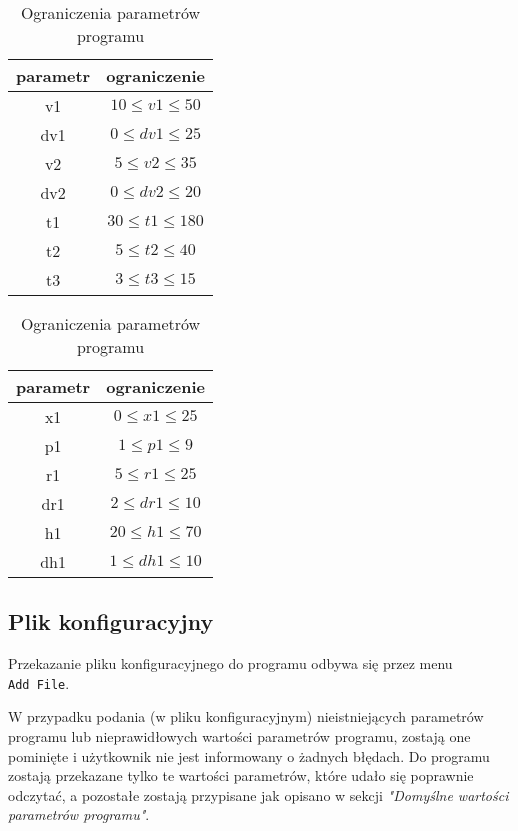 \documentclass[a4paper]{article}
\begin{document}
\begin{table}[ht]
\centering
    \renewcommand{\arraystretch}{1.5}
    \begin{tabular}{|c|c|}
    \rowcolor{lightgray}
        \hline
        parametr&ograniczenie \\
        \hline
        v1& \(10 \leqslant v1 \leqslant 50\)\\
        \hline
        dv1& \(0 \leqslant dv1 \leqslant 25\)\\
        \hline
        v2& \(5 \leqslant v2 \leqslant 35\)\\
        \hline
        dv2& \(0 \leqslant dv2 \leqslant 20\)\\
        \hline
        t1& \(30 \leqslant t1 \leqslant  180\)\\
        \hline
        t2& \(5 \leqslant t2 \leqslant 40\)\\
        \hline
        t3& \(3 \leqslant t3 \leqslant 15\)\\
        \hline
\end{tabular}
\quad
    \begin{tabular}{|c|c|}
    \rowcolor{lightgray}
        \hline 
        parametr&ograniczenie \\
        \hline
        x1& \(0 \leqslant x1 \leqslant 25\)\\ 
        \hline
        p1& \(1 \leqslant p1 \leqslant 9\)\\
        \hline
        r1& \(5 \leqslant r1 \leqslant 25\)\\
        \hline
        dr1& \(2 \leqslant dr1 \leqslant 10\)\\
        \hline
        h1& \(20 \leqslant h1 \leqslant 70\)\\
        \hline
        dh1& \(1 \leqslant dh1 \leqslant 10\)\\
        \hline
\end{tabular}
\color{lightgray}\caption{Ograniczenia parametr\'ow programu}
\label{table:ograniczenia}
\end{table}

\subsection{Plik konfiguracyjny}
\quad Przekazanie pliku konfiguracyjnego do programu odbywa si\k{e} przez menu \\ \texttt{Add File}.

W przypadku podania (w pliku konfiguracyjnym) nieistniej\k{a}cych parametr\'ow programu lub nieprawid\l{}owych warto\'sci parametr\'ow programu, zostaj\k{a} one pomini\k{e}te i u\.zytkownik nie jest informowany o \.zadnych b\l{}\k{e}dach. Do programu zostaj\k{a} przekazane tylko te warto\'sci parametr\'ow, kt\'ore uda\l{}o si\k{e} poprawnie odczyta\'c, a pozosta\l{}e zostaj\k{a} przypisane jak opisano w sekcji \textit{"Domy\'slne warto\'sci parametr\'ow programu"}. 
\end{document}
